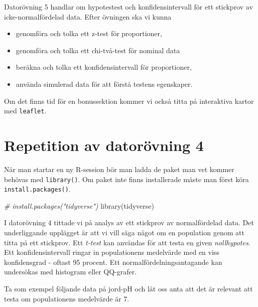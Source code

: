 \documentclass[
]{book}
\newenvironment{Shaded}{\begin{snugshade}}{\end{snugshade}}
\newcommand{\CommentTok}[1]{\textcolor[rgb]{0.56,0.35,0.01}{\textit{#1}}}
\newcommand{\FunctionTok}[1]{\textcolor[rgb]{0.00,0.00,0.00}{#1}}
\newcommand{\NormalTok}[1]{#1}
\theoremstyle{definition}
\theoremstyle{definition}
\theoremstyle{definition}
\theoremstyle{definition}
\theoremstyle{remark}
\begin{document}
Datorövning 5 handlar om hypotestest och konfidensintervall för ett stickprov av icke-normalfördelad data. Efter övningen ska vi kunna

\begin{itemize}
\item
  genomföra och tolka ett z-test för proportioner,
\item
  genomföra och tolka ett chi-två-test för nominal data
\item
  beräkna och tolka ett konfidensintervall för proportioner,
\item
  använda simulerad data för att förstå testens egenskaper.
\end{itemize}

Om det finns tid för en bonussektion kommer vi också titta på interaktiva kartor med \texttt{leaflet}.

\hypertarget{repetition-av-datoruxf6vning-4}{%
\section{Repetition av datorövning 4}\label{repetition-av-datoruxf6vning-4}}

När man startar en ny R-session bör man ladda de paket man vet kommer behövas med \texttt{library()}. Om paket inte finns installerade måste man först köra \texttt{install.packages()}.

\begin{Shaded}
\begin{Highlighting}[]
\CommentTok{\# install.packages("tidyverse")}
\FunctionTok{library}\NormalTok{(tidyverse)}
\end{Highlighting}
\end{Shaded}

I datorövning 4 tittade vi på analys av ett stickprov av normalfördelad data. Det underliggande upplägget är att vi vill säga något om en population genom att titta på ett stickprov. Ett \emph{t-test} kan användas för att testa en given \emph{nollhypotes}. Ett konfidensintervall ringar in populationens medelvärde med en viss konfidensgrad - oftast 95 procent. Ett normalfördelningsantagande kan undersökas med histogram eller QQ-grafer.

Ta som exempel följande data på jord-pH och låt oss anta att det är relevant att testa om populationens medelvärde är 7.
\end{document}
